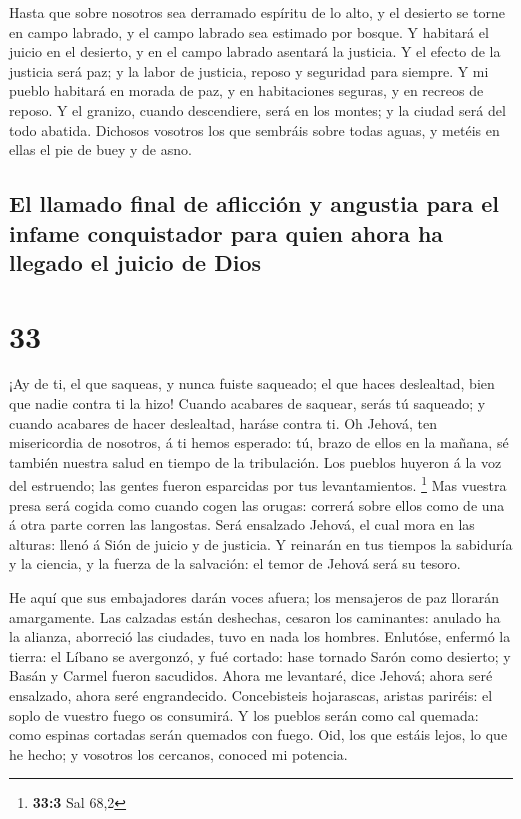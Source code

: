  Hasta que sobre nosotros sea derramado espíritu de lo
alto, y el desierto se torne en campo labrado, y el campo labrado sea
estimado por bosque.  Y habitará el juicio en el
desierto, y en el campo labrado asentará la justicia.  Y
el efecto de la justicia será paz; y la labor de justicia, reposo y
seguridad para siempre.  Y mi pueblo habitará en morada
de paz, y en habitaciones seguras, y en recreos de reposo.
 Y el granizo, cuando descendiere, será en los montes; y
la ciudad será del todo abatida.  Dichosos vosotros los
que sembráis sobre todas aguas, y metéis en ellas el pie de buey y de
asno.

\hypertarget{el-llamado-final-de-aflicciuxf3n-y-angustia-para-el-infame-conquistador-para-quien-ahora-ha-llegado-el-juicio-de-dios}{%
\subsection{El llamado final de aflicción y angustia para el infame
conquistador para quien ahora ha llegado el juicio de
Dios}\label{el-llamado-final-de-aflicciuxf3n-y-angustia-para-el-infame-conquistador-para-quien-ahora-ha-llegado-el-juicio-de-dios}}

\hypertarget{section-32}{%
\section{33}\label{section-32}}

 ¡Ay de ti, el que saqueas, y nunca fuiste saqueado; el
que haces deslealtad, bien que nadie contra ti la hizo! Cuando acabares
de saquear, serás tú saqueado; y cuando acabares de hacer deslealtad,
haráse contra ti.  Oh Jehová, ten misericordia de
nosotros, á ti hemos esperado: tú, brazo de ellos en la mañana, sé
también nuestra salud en tiempo de la tribulación.  Los
pueblos huyeron á la voz del estruendo; las gentes fueron esparcidas por
tus levantamientos. \footnote{\textbf{33:3} Sal 68,2}  Mas
vuestra presa será cogida como cuando cogen las orugas: correrá sobre
ellos como de una á otra parte corren las langostas.  Será
ensalzado Jehová, el cual mora en las alturas: llenó á Sión de juicio y
de justicia.  Y reinarán en tus tiempos la sabiduría y la
ciencia, y la fuerza de la salvación: el temor de Jehová será su tesoro.

 He aquí que sus embajadores darán voces afuera; los
mensajeros de paz llorarán amargamente.  Las calzadas
están deshechas, cesaron los caminantes: anulado ha la alianza,
aborreció las ciudades, tuvo en nada los hombres. 
Enlutóse, enfermó la tierra: el Líbano se avergonzó, y fué cortado: hase
tornado Sarón como desierto; y Basán y Carmel fueron sacudidos.
 Ahora me levantaré, dice Jehová; ahora seré ensalzado,
ahora seré engrandecido.  Concebisteis hojarascas,
aristas pariréis: el soplo de vuestro fuego os consumirá.
 Y los pueblos serán como cal quemada: como espinas
cortadas serán quemados con fuego.  Oid, los que estáis
lejos, lo que he hecho; y vosotros los cercanos, conoced mi potencia.

